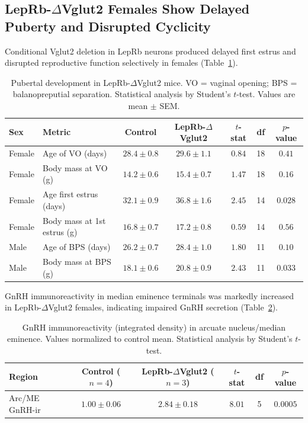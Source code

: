 \documentclass[11pt]{article}
\begin{document}
\subsection{LepRb-$\Delta$Vglut2 Females Show Delayed Puberty and Disrupted Cyclicity}

Conditional Vglut2 deletion in LepRb neurons produced delayed first estrus and disrupted reproductive function selectively in females (Table~\ref{tab:puberty}).

\begin{table}[H]
\centering
\caption{Pubertal development in LepRb-$\Delta$Vglut2 mice. VO = vaginal opening; BPS = balanopreputial separation. Statistical analysis by Student's $t$-test. Values are mean $\pm$ SEM.}
\label{tab:puberty}
\begin{tabular}{llccccc}
\toprule
\textbf{Sex} & \textbf{Metric} & \textbf{Control} & \textbf{LepRb-$\Delta$Vglut2} & \textbf{$t$-stat} & \textbf{df} & \textbf{$p$-value} \\
\midrule
Female & Age of VO (days) & $28.4 \pm 0.8$ & $29.6 \pm 1.1$ & $0.84$ & 18 & $0.41$ \\
Female & Body mass at VO (g) & $14.2 \pm 0.6$ & $15.4 \pm 0.7$ & $1.47$ & 18 & $0.16$ \\
Female & Age first estrus (days) & $32.1 \pm 0.9$ & $36.8 \pm 1.6$ & $2.45$ & 14 & $\mathbf{0.028}$ \\
Female & Body mass at 1st estrus (g) & $16.8 \pm 0.7$ & $17.2 \pm 0.8$ & $0.59$ & 14 & $0.56$ \\
Male & Age of BPS (days) & $26.2 \pm 0.7$ & $28.4 \pm 1.0$ & $1.80$ & 11 & $0.10$ \\
Male & Body mass at BPS (g) & $18.1 \pm 0.6$ & $20.8 \pm 0.9$ & $2.43$ & 11 & $\mathbf{0.033}$ \\
\bottomrule
\end{tabular}
\end{table}

GnRH immunoreactivity in median eminence terminals was markedly increased in LepRb-$\Delta$Vglut2 females, indicating impaired GnRH secretion (Table~\ref{tab:gnrh}).

\begin{table}[H]
\centering
\caption{GnRH immunoreactivity (integrated density) in arcuate nucleus/median eminence. Values normalized to control mean. Statistical analysis by Student's $t$-test.}
\label{tab:gnrh}
\begin{tabular}{lccccc}
\toprule
\textbf{Region} & \textbf{Control ($n=4$)} & \textbf{LepRb-$\Delta$Vglut2 ($n=3$)} & \textbf{$t$-stat} & \textbf{df} & \textbf{$p$-value} \\
\midrule
Arc/ME GnRH-ir & $1.00 \pm 0.06$ & $2.84 \pm 0.18$ & $8.01$ & 5 & $\mathbf{0.0005}$ \\
\bottomrule
\end{tabular}
\end{table}
\end{document}
